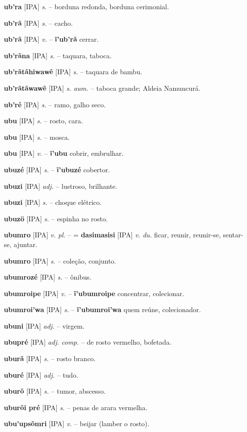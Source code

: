 \textbf{ub'ra} [IPA] \textit{s.} -- borduna redonda, borduna cerimonial.

\textbf{ub'rã} [IPA] \textit{s.} -- cacho.

\textbf{ub'rã} [IPA] \textit{v.} -- \textbf{ĩ'ub'rã} cerrar.

\textbf{ub'rãna} [IPA] \textit{s.} -- taquara, taboca.

\textbf{ub'rãtãhiwawẽ} [IPA] \textit{s.} -- taquara de bambu.

\textbf{ub'rãtãwawẽ} [IPA] \textit{s. aum.} -- taboca grande; Aldeia Namuncurá.

\textbf{ub'ré} [IPA] \textit{s.} -- ramo, galho seco.

\textbf{ubu} [IPA] \textit{s.} -- rosto, cara.

\textbf{ubu} [IPA] \textit{s.} -- mosca.

\textbf{ubu} [IPA] \textit{v.} -- \textbf{ĩ'ubu} cobrir, embrulhar.

\textbf{ubuzé} [IPA] \textit{s.} -- \textbf{ĩ'ubuzé} cobertor.

\textbf{ubuzi} [IPA] \textit{adj.} -- lustroso, brilhante.

\textbf{ubuzi} [IPA] \textit{s.} -- choque elétrico.

\textbf{ubuzö} [IPA] \textit{s.} -- espinha no rosto.

\textbf{ubumro} [IPA] \textit{v. pl.} -- = \textbf{dasimasisi} [IPA] \textit{v. du.} ficar, reunir, reunir-se, sentar-se, ajuntar.

\textbf{ubumro} [IPA] \textit{s.} -- coleção, conjunto.

\textbf{ubumrozé} [IPA] \textit{s.} -- ônibus.

\textbf{ubumroipe} [IPA] \textit{v.} -- \textbf{ĩ'ubumroipe} concentrar, colecionar.

\textbf{ubumroi'wa} [IPA] \textit{s.} -- \textbf{ĩ'ubumroi'wa} quem reúne, colecionador.

\textbf{ubuni} [IPA] \textit{adj.} -- virgem.

\textbf{ubupré} [IPA] \textit{adj. comp.} -- de rosto vermelho, bofetada.

\textbf{uburã} [IPA] \textit{s.} -- rosto branco.

\textbf{uburé} [IPA] \textit{adj.} -- tudo.

\textbf{uburõ} [IPA] \textit{s.} -- tumor, abscesso.

\textbf{uburõi pré} [IPA] \textit{s.} -- penas de arara vermelha.

\textbf{ubu'upsõmri} [IPA] \textit{v.} -- beijar (lamber o rosto).

